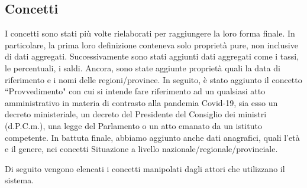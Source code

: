 \subsection{Concetti}
\label{ss:concetti}
I concetti sono stati più volte rielaborati per raggiungere la loro forma finale.
In particolare, la prima loro definizione conteneva solo proprietà pure, non inclusive di dati aggregati. Successivamente sono stati aggiunti dati aggregati come i tassi, le percentuali, i saldi.
Ancora, sono state aggiunte proprietà quali la data di riferimento e i nomi delle regioni/province.
In seguito, è stato aggiunto il concetto ``Provvedimento" con cui si intende fare riferimento ad un qualsiasi atto amministrativo in materia di contrasto alla pandemia Covid-19, sia esso un decreto ministeriale, un decreto del Presidente del Consiglio dei ministri (d.P.C.m.), una legge del Parlamento o un atto emanato da un istituto competente.
In battuta finale, abbiamo aggiunto anche dati anagrafici, quali l'età e il genere, nei concetti Situazione a livello nazionale/regionale/provinciale.

Di seguito vengono elencati i concetti manipolati dagli attori che utilizzano il sistema.

